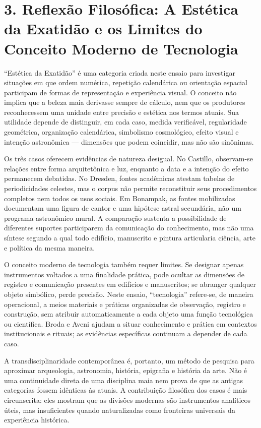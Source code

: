 \documentclass[
  brazilian,
]{article}
\begin{document}
\section{3. Reflexão Filosófica: A Estética da Exatidão e os Limites do
Conceito Moderno de
Tecnologia}\label{reflexuxe3o-filosuxf3fica-a-estuxe9tica-da-exatiduxe3o-e-os-limites-do-conceito-moderno-de-tecnologia}

``Estética da Exatidão'' é uma categoria criada neste ensaio para
investigar situações em que ordem numérica, repetição calendárica ou
orientação espacial participam de formas de representação e experiência
visual. O conceito não implica que a beleza maia derivasse sempre de
cálculo, nem que os produtores reconhecessem uma unidade entre precisão
e estética nos termos atuais. Sua utilidade depende de distinguir, em
cada caso, medida verificável, regularidade geométrica, organização
calendárica, simbolismo cosmológico, efeito visual e intenção
astronômica --- dimensões que podem coincidir, mas não são sinônimas.

Os três casos oferecem evidências de natureza desigual. No Castillo,
observam-se relações entre forma arquitetônica e luz, enquanto a data e
a intenção do efeito permanecem debatidas. No Dresden, fontes acadêmicas
atestam tabelas de periodicidades celestes, mas o corpus não permite
reconstituir seus procedimentos completos nem todos os usos sociais. Em
Bonampak, as fontes mobilizadas documentam uma figura de cantor e uma
hipótese astral secundária, não um programa astronômico mural. A
comparação sustenta a possibilidade de diferentes suportes participarem
da comunicação do conhecimento, mas não uma síntese segundo a qual todo
edifício, manuscrito e pintura articularia ciência, arte e política da
mesma maneira.

O conceito moderno de tecnologia também requer limites. Se designar
apenas instrumentos voltados a uma finalidade prática, pode ocultar as
dimensões de registro e comunicação presentes em edifícios e
manuscritos; se abranger qualquer objeto simbólico, perde precisão.
Neste ensaio, ``tecnologia'' refere-se, de maneira operacional, a meios
materiais e práticas organizadas de observação, registro e construção,
sem atribuir automaticamente a cada objeto uma função tecnológica ou
científica. Broda e Aveni ajudam a situar conhecimento e prática em
contextos institucionais e rituais; as evidências específicas continuam
a depender de cada caso.

A transdisciplinaridade contemporânea é, portanto, um método de pesquisa
para aproximar arqueologia, astronomia, história, epigrafia e história
da arte. Não é uma continuidade direta de uma disciplina maia nem prova
de que as antigas categorias fossem idênticas às atuais. A contribuição
filosófica dos casos é mais circunscrita: eles mostram que as divisões
modernas são instrumentos analíticos úteis, mas insuficientes quando
naturalizadas como fronteiras universais da experiência histórica.
\end{document}
